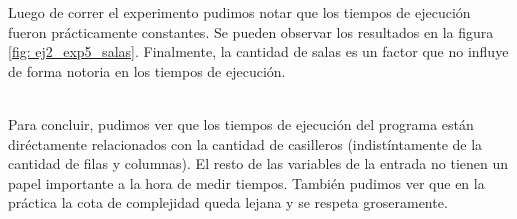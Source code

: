 \par Luego de correr el experimento pudimos notar que los tiempos de ejecución fueron prácticamente constantes. Se pueden observar los resultados en la figura \ref{fig: ej2_exp5_salas}. Finalmente, la cantidad de salas es un factor que no influye de forma notoria en los tiempos de ejecución.
\\
\\
\par Para concluir, pudimos ver que los tiempos de ejecución del programa están diréctamente relacionados con la cantidad de casilleros (indistíntamente de la cantidad de filas y columnas). El resto de las variables de la entrada no tienen un papel importante a la hora de medir tiempos. También pudimos ver que en la práctica la cota de complejidad queda lejana y se respeta groseramente.